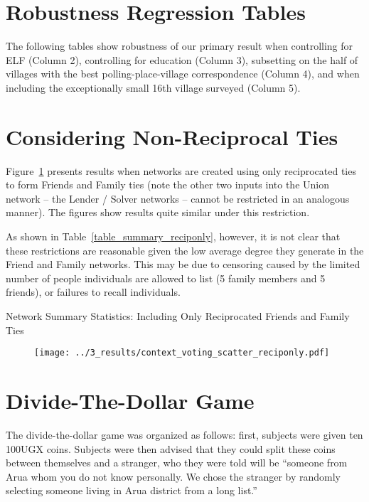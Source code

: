 \documentclass[12pt]{article}
\begin{document}
\begin{appendix}
\section{Robustness Regression Tables}\label{appendix_robustness}
The following tables show robustness of our primary result when controlling for ELF (Column 2), controlling for education (Column 3), subsetting on the half of villages with the best polling-place-village correspondence (Column 4), and when including the exceptionally small 16th village surveyed (Column 5).


\pagebreak

\section{Considering Non-Reciprocal Ties}\label{appendix_reciponly}

Figure~\ref{figure_context_voting_scatter_reciponly} presents results when networks are created using only reciprocated ties to form Friends and Family ties (note the other two inputs into the Union network -- the Lender / Solver networks -- cannot be restricted in an analogous manner). The figures show results quite similar under this restriction.

As shown in Table~\ref{table_summary_reciponly}, however, it is not clear that these restrictions are reasonable given the low average degree they generate in the Friend and Family networks. This may be due to censoring caused by the limited number of people individuals are allowed to list (5 family members and 5 friends), or failures to recall individuals.

\begin{table}
\centering
\caption{Network Summary Statistics: Including Only Reciprocated Friends and Family Ties }\label{table_summary_reciponly}

\end{table}


\begin{figure}[h!]
	\begin{center}
	    \caption{}\label{figure_context_voting_scatter_reciponly}
    		\texttt{[image: ../3\_results/context\_voting\_scatter\_reciponly.pdf]}
    \end{center}
\end{figure}

\pagebreak
\section{Divide-The-Dollar Game}\label{appendix_divide_the_dollar}
The divide-the-dollar game was organized as follows: first, subjects were given ten 100UGX coins. Subjects were then advised that they could split these coins between themselves and a stranger, who they were told will be ``someone from Arua whom you do not know personally. We chose the stranger by randomly selecting someone living in Arua district from a long list.''





\end{appendix}
\end{document}
